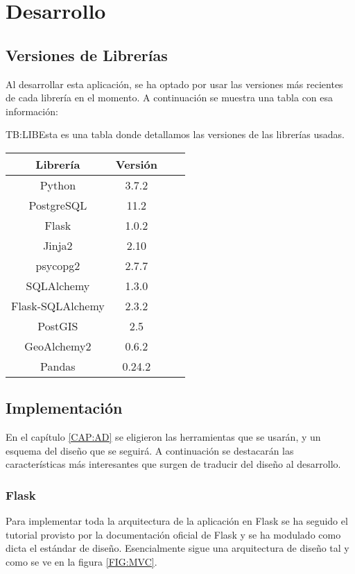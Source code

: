 
\chapter{Desarrollo\label{CAP:DESARROLLO}}
  \section{Versiones de Librerías}
    Al desarrollar esta aplicación, se ha optado por usar las versiones más recientes de cada librería en el momento. A continuación se muestra una tabla con esa información:

    \begin{table}[Tabla de versiones de librerías]{TB:LIB}{Esta es una tabla donde detallamos las versiones de las librerías usadas.}
      \begin{tabular}{cccc}
        \hline
        \textbf{Librería} & \textbf{Versión} \\
        \hline \hline
        Python & 3.7.2 \\
        PostgreSQL & 11.2 \\
        Flask & 1.0.2 \\
        Jinja2 & 2.10 \\
        psycopg2 & 2.7.7 \\  
        SQLAlchemy & 1.3.0 \\ 
        Flask-SQLAlchemy & 2.3.2 \\
        PostGIS & 2.5 \\
        GeoAlchemy2 & 0.6.2 \\
        Pandas & 0.24.2 \\
        \hline
      \end{tabular}
    \end{table}
  
  
  \section{Implementación}
    En el capítulo \ref{CAP:AD} se eligieron las herramientas que se usarán, y un esquema del diseño que se seguirá. A continuación se destacarán las características más interesantes que surgen de traducir del diseño al desarrollo.
    
    \subsection{Flask}
      Para implementar toda la arquitectura de la aplicación en Flask se ha seguido el tutorial provisto por la documentación oficial de Flask \cite{flask} y se ha modulado como dicta el estándar de diseño.
      Esencialmente sigue una arquitectura de diseño  tal y como se ve en la figura \ref{FIG:MVC}. 
      

